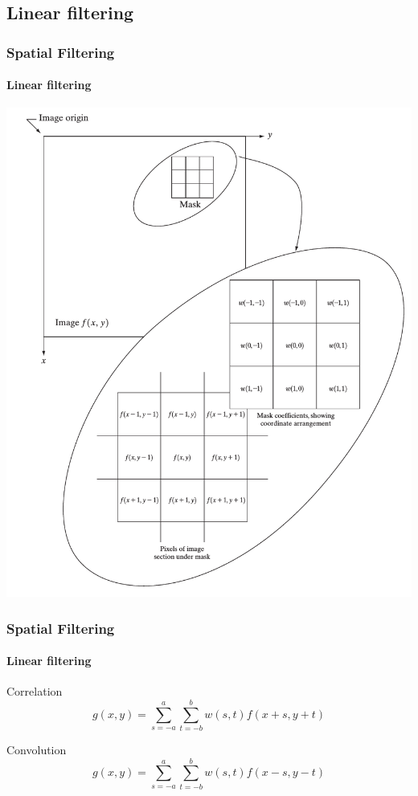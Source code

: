 \documentclass[table]{beamer}
\begin{document}
\subsection{Linear filtering}
\begin{frame}
\frametitle{Spatial Filtering}
\framesubtitle{Linear filtering}
\begin{center}
\includegraphics[scale=0.23]{images/Spatial2.png}
\end{center}
\end{frame}

\begin{frame}
\frametitle{Spatial Filtering}
\framesubtitle{Linear filtering}
\begin{block}{Correlation}
\begin{equation}
  g(x,y) = \sum^{a}_{s=-a}\sum^{b}_{t=-b} w(s,t)f(x+s, y+t)
\end{equation}
\end{block}
\begin{block}{Convolution}
\begin{equation}
  g(x,y) = \sum^{a}_{s=-a}\sum^{b}_{t=-b} w(s,t)f(x-s, y-t)
\end{equation}
\end{block}
\end{frame}
\end{document}
